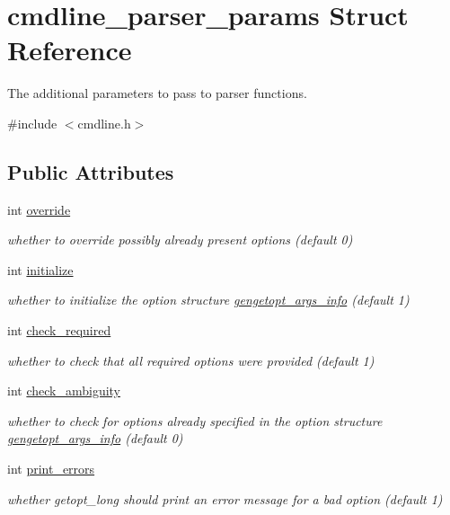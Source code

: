 \hypertarget{structcmdline__parser__params}{}\section{cmdline\+\_\+parser\+\_\+params Struct Reference}
\label{structcmdline__parser__params}


The additional parameters to pass to parser functions.  




{\ttfamily \#include $<$cmdline.\+h$>$}

\subsection*{Public Attributes}
\begin{DoxyCompactItemize}
\item 
int \hyperlink{structcmdline__parser__params_ad3ff9d69146e69a47506782197b5675c}{override}
\begin{DoxyCompactList}\small\item\em whether to override possibly already present options (default 0) \end{DoxyCompactList}\item 
int \hyperlink{structcmdline__parser__params_a97ed8a6eabd39291ae7d73f273e12c11}{initialize}
\begin{DoxyCompactList}\small\item\em whether to initialize the option structure \hyperlink{structgengetopt__args__info}{gengetopt\+\_\+args\+\_\+info} (default 1) \end{DoxyCompactList}\item 
int \hyperlink{structcmdline__parser__params_a44ff439d7e9e36799e59173af74829c6}{check\+\_\+required}
\begin{DoxyCompactList}\small\item\em whether to check that all required options were provided (default 1) \end{DoxyCompactList}\item 
int \hyperlink{structcmdline__parser__params_a6e4442704fc40b0b655f7cc602f13ec4}{check\+\_\+ambiguity}
\begin{DoxyCompactList}\small\item\em whether to check for options already specified in the option structure \hyperlink{structgengetopt__args__info}{gengetopt\+\_\+args\+\_\+info} (default 0) \end{DoxyCompactList}\item 
int \hyperlink{structcmdline__parser__params_a3236f066777488e8502abe05ccd24455}{print\+\_\+errors}
\begin{DoxyCompactList}\small\item\em whether getopt\+\_\+long should print an error message for a bad option (default 1) \end{DoxyCompactList}\end{DoxyCompactItemize}


